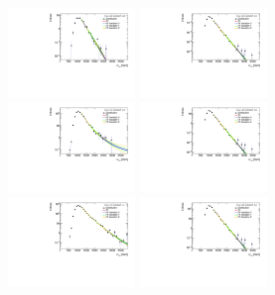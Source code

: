 \begin{figure}[htbp!]
\begin{center}
\includegraphics[width=0.3\textwidth,angle=-90]{figures/boosted/Smooth/qcd_est_FourTag_Signal_mHH_pole_l.pdf}
\includegraphics[width=0.3\textwidth,angle=-90]{figures/boosted/Smooth/ttbar_est_FourTag_Signal_mHH_pole_l.pdf} \\ 
\includegraphics[width=0.3\textwidth,angle=-90]{figures/boosted/Smooth/qcd_est_ThreeTag_Signal_mHH_pole_l.pdf}
\includegraphics[width=0.3\textwidth,angle=-90]{figures/boosted/Smooth/ttbar_est_ThreeTag_Signal_mHH_pole_l.pdf}\\
\includegraphics[width=0.3\textwidth,angle=-90]{figures/boosted/Smooth/qcd_est_TwoTag_split_Signal_mHH_pole_l.pdf}
\includegraphics[width=0.3\textwidth,angle=-90]{figures/boosted/Smooth/ttbar_est_TwoTag_split_Signal_mHH_pole_l.pdf}\\

\end{center}
\end{figure}
